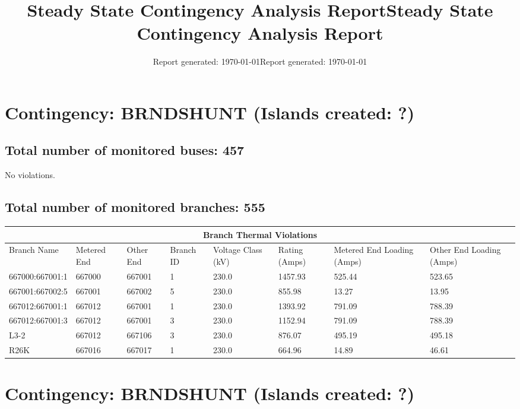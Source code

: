 \documentclass{article}%
\title{Steady State Contingency Analysis Report\vspace{-3ex}}%
\date{Report generated: \today\vspace{-2ex}}%
\title{Steady State Contingency Analysis Report\vspace{-3ex}}%
\date{Report generated: \today\vspace{-2ex}}%
\begin{document}
%
\normalsize%
\maketitle%
\section*{Contingency: BRNDSHUNT (Islands created: ?)}%
\label{sec:ContingencyBRNDSHUNT(Islandscreated?)}%
\subsection*{Total number of monitored buses: 457}%
\label{subsec:Totalnumberofmonitoredbuses457}%
No violations.

%
\subsection*{Total number of monitored branches: 555}%
\label{subsec:Totalnumberofmonitoredbranches555}%
\begin{tabularx}{\textwidth}{| p{2.51cm} | p{1.5cm} | p{1.5cm} | p{1.5cm} | p{1.5cm} | p{1.5cm} | p{1.5cm} | p{1.5cm} |}%
\hline%
\multicolumn{8}{|c|}{Branch Thermal Violations}\\%
\hline%
Branch Name&Metered End&Other End&Branch ID&Voltage Class (kV)&Rating (Amps)&Metered End Loading (Amps)&Other End Loading (Amps)\\%
\hline%
667000:667001:1&667000&667001&1&230.0&1457.93&525.44&523.65\\%
\hline%
667001:667002:5&667001&667002&5&230.0&855.98&13.27&13.95\\%
\hline%
667012:667001:1&667012&667001&1&230.0&1393.92&791.09&788.39\\%
\hline%
667012:667001:3&667012&667001&3&230.0&1152.94&791.09&788.39\\%
\hline%
L3{-}2&667012&667106&3&230.0&876.07&495.19&495.18\\%
\hline%
R26K&667016&667017&1&230.0&664.96&14.89&46.61\\%
\hline%
\end{tabularx}

%
\maketitle%
\section*{Contingency: BRNDSHUNT (Islands created: ?)}%
\label{sec:ContingencyBRNDSHUNT(Islandscreated?)}%
\end{document}
